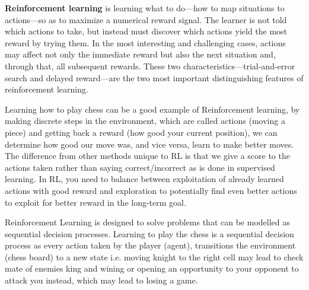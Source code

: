 
\textbf{Reinforcement learning} is learning what to do—how to map situations to actions—so as to maximize a numerical reward signal. The learner is not told which actions to take, but instead must discover which actions yield the most reward by trying them. In the most interesting and challenging cases, actions may affect not only the immediate reward but also the next situation and, through that, all subsequent rewards. These two characteristics—trial-and-error search and delayed reward—are the two most important distinguishing features of reinforcement learning. \cite{sutton}


Learning how to play chess can be a good example of Reinforcement learning, by making discrete steps in the environment, which are called actions (moving a piece) and getting back a reward (how good your current position), we can determine how good our move was, and vice versa, learn to make better moves. The difference from other methods unique to RL is that we give a score to the actions taken rather than saying correct/incorrect as is done in supervised learning. In RL, you need to balance between exploitation of already learned actions with good reward and exploration to potentially find even better actions to exploit for better reward in the long-term goal.

Reinforcement Learning is designed to solve problems that can
be modelled as sequential decision processes. \cite{barto1989learning}
Learning to play the chess is a sequential decision process as every action taken by the player (agent), transitions the environment (chess board) to a new state i.e. moving knight to the right cell may lead to check mate of enemies king and wining or opening an opportunity to your opponent to attack you instead, which may lead to losing a game.


